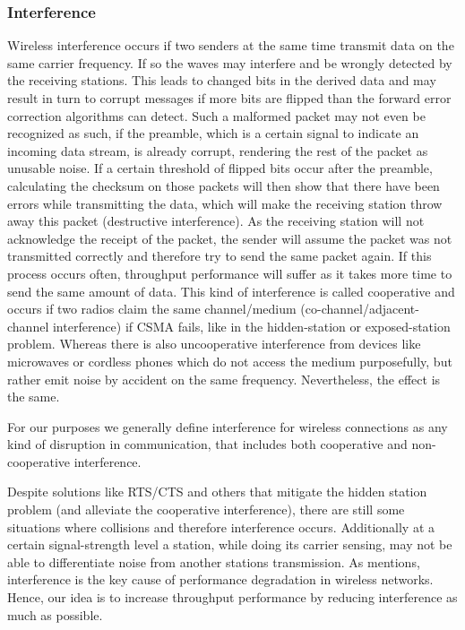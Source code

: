       \subsubsection{Interference}
	Wireless interference occurs if two senders at the same time transmit data on the same carrier frequency. If so the waves may interfere and be wrongly detected
	by the receiving stations. This leads to changed bits in the derived data and may result in turn to corrupt messages if more bits are flipped than the
	forward error correction algorithms can detect. Such a malformed packet may not even be recognized as such, if the preamble, which is a certain signal to indicate an
	incoming data stream, is already corrupt, rendering the rest of the packet as unusable noise. If a certain threshold of flipped bits occur after the preamble,
	calculating the checksum on those packets will then show that there have been errors while transmitting the data, which will make the receiving station 
	throw away this packet (destructive interference).
	As the receiving station will not acknowledge the receipt of the packet, the sender will assume the packet was not transmitted correctly and therefore try 
	to send the same packet again. If this process occurs often, throughput performance will suffer as it takes more time to send the same amount of data.
	This kind of interference is called cooperative and occurs if two radios claim the same channel/medium (co-channel/adjacent-channel interference) if CSMA fails,
	like in the hidden-station or exposed-station problem.
	Whereas there is also uncooperative interference from devices like microwaves or cordless phones which do not access the medium purposefully, but rather
	emit noise by accident on the same frequency. Nevertheless, the effect is the same.
	
	For our purposes we generally define interference for wireless connections as any kind of disruption in communication, 
	that includes both cooperative and non-cooperative interference.
	
	Despite solutions like RTS/CTS and others that mitigate the hidden station problem (and alleviate the cooperative interference),
	there are still some situations where collisions and therefore interference occurs.
	Additionally at a certain signal-strength level a station, while doing its carrier sensing, may not be able to differentiate noise from another stations transmission.
	As \cite{padhye2005estimation} mentions, interference is the key cause of performance degradation in wireless networks. Hence, our idea is to increase throughput 
	performance by reducing interference as much as possible.
	
